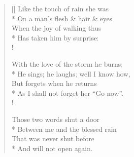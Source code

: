 \documentclass[MAIN]{subfiles}
\begin{document}
\settowidth{\versewidth}{He sings; he laughs; well I know how,}
\begin{verse}[\versewidth]
Like the touch of rain she was\\*
On a man's flesh \& hair \& eyes\\
When the joy of walking thus\\*
Has taken him by surprise:\\!

With the love of the storm he burns;\\*
He sings; he laughs; well I know how,\\
But forgets when he returns\\*
As I shall not forget her ``Go now''.\\!

Those two words shut a door\\*
Between me and the blessed rain\\
That was never shut before\\*
And will not open again.
\end{verse}
\end{document}
